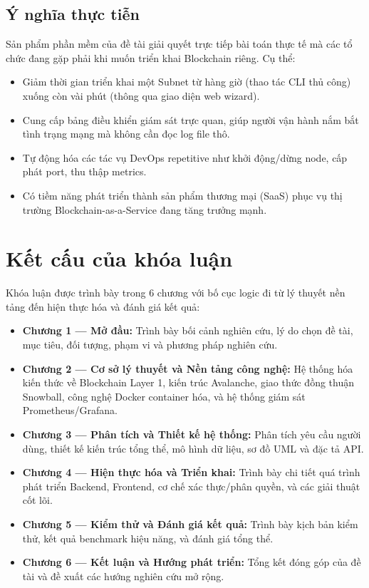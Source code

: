 \subsection{Ý nghĩa thực tiễn}

Sản phẩm phần mềm của đề tài giải quyết trực tiếp bài toán thực tế mà các tổ chức đang gặp phải khi muốn triển khai Blockchain riêng. Cụ thể:

\begin{itemize}
    \item Giảm thời gian triển khai một Subnet từ hàng giờ (thao tác CLI thủ công) xuống còn vài phút (thông qua giao diện web wizard).
    \item Cung cấp bảng điều khiển giám sát trực quan, giúp người vận hành nắm bắt tình trạng mạng mà không cần đọc log file thô.
    \item Tự động hóa các tác vụ DevOps repetitive như khởi động/dừng node, cấp phát port, thu thập metrics.
    \item Có tiềm năng phát triển thành sản phẩm thương mại (SaaS) phục vụ thị trường Blockchain-as-a-Service đang tăng trưởng mạnh.
\end{itemize}

\section{Kết cấu của khóa luận}

Khóa luận được trình bày trong 6 chương với bố cục logic đi từ lý thuyết nền tảng đến hiện thực hóa và đánh giá kết quả:

\begin{itemize}
    \item \textbf{Chương 1 --- Mở đầu:} Trình bày bối cảnh nghiên cứu, lý do chọn đề tài, mục tiêu, đối tượng, phạm vi và phương pháp nghiên cứu.

    \item \textbf{Chương 2 --- Cơ sở lý thuyết và Nền tảng công nghệ:} Hệ thống hóa kiến thức về Blockchain Layer 1, kiến trúc Avalanche, giao thức đồng thuận Snowball, công nghệ Docker container hóa, và hệ thống giám sát Prometheus/Grafana.

    \item \textbf{Chương 3 --- Phân tích và Thiết kế hệ thống:} Phân tích yêu cầu người dùng, thiết kế kiến trúc tổng thể, mô hình dữ liệu, sơ đồ UML và đặc tả API.

    \item \textbf{Chương 4 --- Hiện thực hóa và Triển khai:} Trình bày chi tiết quá trình phát triển Backend, Frontend, cơ chế xác thực/phân quyền, và các giải thuật cốt lõi.

    \item \textbf{Chương 5 --- Kiểm thử và Đánh giá kết quả:} Trình bày kịch bản kiểm thử, kết quả benchmark hiệu năng, và đánh giá tổng thể.

    \item \textbf{Chương 6 --- Kết luận và Hướng phát triển:} Tổng kết đóng góp của đề tài và đề xuất các hướng nghiên cứu mở rộng.
\end{itemize}
